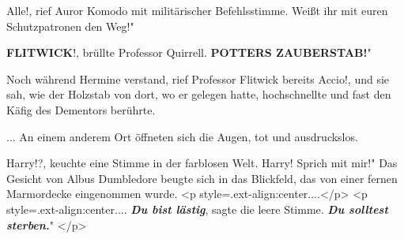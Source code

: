 \glqq{}Alle!\grqq{}, rief Auror Komodo mit militärischer Befehlsstimme. \glqq
Weißt ihr mit euren Schutzpatronen den Weg!"

\glqq{}\textbf{FLITWICK}!\grqq{}, brüllte Professor Quirrell. \glqq
\textbf{POTTERS ZAUBERSTAB!}"

Noch während Hermine verstand, rief Professor Flitwick bereits \glqq
Accio!\grqq{}, und sie sah, wie der Holzstab von dort, wo er gelegen hatte,
hochschnellte und fast den Käfig des Dementors berührte.

... An einem anderem Ort öffneten sich die Augen, tot und ausdruckslos.

\glqq{}Harry!?\grqq{}, keuchte eine Stimme in der farblosen Welt. \glqq{}Harry!
Sprich mit mir!" Das Gesicht von Albus Dumbledore beugte sich in das Blickfeld,
das von einer fernen Marmordecke eingenommen wurde. <p
style=\grqq{}.ext-align:center\grqq{}....</p> <p
style=\grqq{}.ext-align:center\grqq{}.... \glqq{}\textbf{\emph{Du bist
lästig}}\grqq{}, sagte die leere Stimme. \glqq{}\textbf{\emph{Du solltest
sterben.}}" </p>

